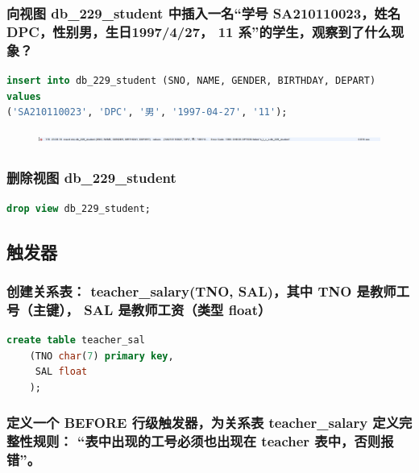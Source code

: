 \documentclass{ctexart}
\begin{document}
\subsubsection{向视图 db\_229\_student 中插入一名“学号 SA210110023，姓名 DPC，性别男，生日1997/4/27， 11 系”的学生，观察到了什么现象？}
\begin{lstlisting}[language=sql]
insert into db_229_student (SNO, NAME, GENDER, BIRTHDAY, DEPART)  
values   
('SA210110023', 'DPC', '男', '1997-04-27', '11');

\end{lstlisting}
\begin{figure}[H]
	\centering 
	\includegraphics[height=0.5cm,width=14cm]{50.png}
	\end{figure}
\subsubsection{删除视图 db\_229\_student}
\begin{lstlisting}[language=sql]
	drop view db_229_student;
\end{lstlisting}
\subsection{触发器}
\subsubsection{创建关系表： teacher\_salary(TNO, SAL)，其中 TNO 是教师工号（主键）， SAL 是教师工资（类型 float）}
\begin{lstlisting}[language=sql]
	create table teacher_sal
	(TNO char(7) primary key,  
	 SAL float
	);
\end{lstlisting}
\subsubsection{定义一个 BEFORE 行级触发器，为关系表 teacher\_salary 定义完整性规则： “表中出现的工号必须也出现在 teacher 表中，否则报错”。}
\end{document}
